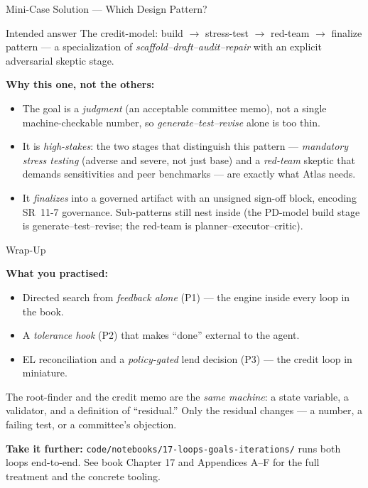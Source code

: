\documentclass[9pt,t]{beamer}
\begin{document}
\begin{frame}{Mini-Case Solution --- Which Design Pattern?}

\begin{block}{Intended answer}
The \alert{credit-model: build $\to$ stress-test $\to$ red-team $\to$ finalize}
pattern --- a specialization of \emph{scaffold--draft--audit--repair} with an
explicit adversarial skeptic stage.
\end{block}

\medskip
\textbf{Why this one, not the others:}
\begin{itemize}
  \item The goal is a \emph{judgment} (an acceptable committee memo), not a single
        machine-checkable number, so \emph{generate--test--revise} alone is too
        thin.
  \item It is \emph{high-stakes}: the two stages that distinguish this pattern ---
        \emph{mandatory stress testing} (adverse and severe, not just base) and a
        \emph{red-team} skeptic that demands sensitivities and peer benchmarks ---
        are exactly what Atlas needs.
  \item It \emph{finalizes} into a governed artifact with an unsigned sign-off
        block, encoding SR~11-7 governance. Sub-patterns still nest inside (the
        PD-model build stage is generate--test--revise; the red-team is
        planner--executor--critic).
\end{itemize}
\end{frame}

\begin{frame}{Wrap-Up}

\textbf{What you practised:}
\begin{itemize}
  \item Directed search from \emph{feedback alone} (P1) --- the engine inside every
        loop in the book.
  \item A \emph{tolerance hook} (P2) that makes ``done'' external to the agent.
  \item EL reconciliation and a \emph{policy-gated} lend decision (P3) --- the
        credit loop in miniature.
\end{itemize}

\medskip
\begin{bigpicture}
The root-finder and the credit memo are the \emph{same machine}: a state variable,
a validator, and a definition of ``residual.'' Only the residual changes --- a
number, a failing test, or a committee's objection.
\end{bigpicture}

\medskip
\textbf{Take it further:} \texttt{code/notebooks/17-loops-goals-iterations/} runs
both loops end-to-end. See book Chapter 17 and Appendices A--F for the full
treatment and the concrete tooling.
\end{frame}
\end{document}
